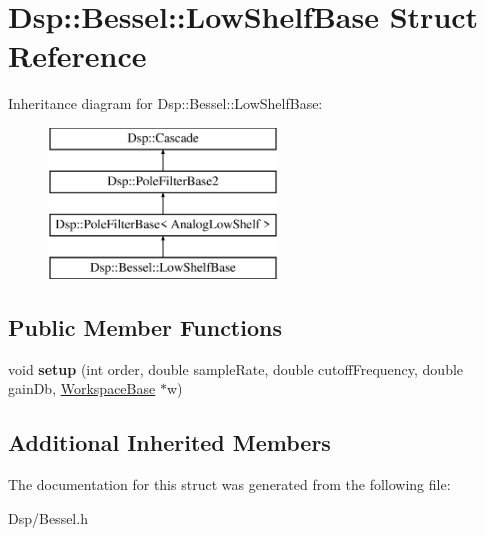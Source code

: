 \hypertarget{structDsp_1_1Bessel_1_1LowShelfBase}{\section{Dsp\-:\-:Bessel\-:\-:Low\-Shelf\-Base Struct Reference}
\label{structDsp_1_1Bessel_1_1LowShelfBase}
}
Inheritance diagram for Dsp\-:\-:Bessel\-:\-:Low\-Shelf\-Base\-:\begin{figure}[H]
\begin{center}
\leavevmode
\includegraphics[height=4.000000cm]{structDsp_1_1Bessel_1_1LowShelfBase}
\end{center}
\end{figure}
\subsection*{Public Member Functions}
\begin{DoxyCompactItemize}
\item 
\hypertarget{structDsp_1_1Bessel_1_1LowShelfBase_ace331e8896e3d449f58503655998db7d}{void {\bfseries setup} (int order, double sample\-Rate, double cutoff\-Frequency, double gain\-Db, \hyperlink{structDsp_1_1Bessel_1_1WorkspaceBase}{Workspace\-Base} $\ast$w)}\label{structDsp_1_1Bessel_1_1LowShelfBase_ace331e8896e3d449f58503655998db7d}

\end{DoxyCompactItemize}
\subsection*{Additional Inherited Members}


The documentation for this struct was generated from the following file\-:\begin{DoxyCompactItemize}
\item 
Dsp/Bessel.\-h\end{DoxyCompactItemize}
